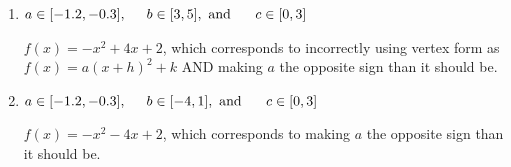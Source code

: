 \documentclass{extbook}[14pt]
\begin{document}
\begin{enumerate}
{\begin{enumerate}[label=\Alph*.]
$f(x)=x^{2} -4 x + 10$, which corresponds to incorrectly using vertex form as $f(x) = a(x+h)^2+k$.
\item \( a \in [-1.2, -0.3], \hspace*{5mm} b \in [3, 5], \text{ and } \hspace*{5mm} c \in [0, 3] \)

$f(x)=-x^{2} +4 x + 2$, which corresponds to incorrectly using vertex form as $f(x) = a(x+h)^2+k$ AND making $a$ the opposite sign than it should be.
\item \( a \in [-1.2, -0.3], \hspace*{5mm} b \in [-4, 1], \text{ and } \hspace*{5mm} c \in [0, 3] \)

$f(x)=-x^{2} -4 x + 2$, which corresponds to making $a$ the opposite sign than it should be.
\end{enumerate}

}
\end{enumerate}
\end{document}
